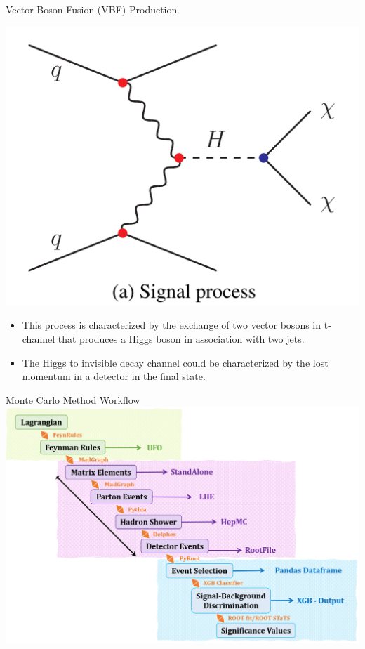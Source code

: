 \documentclass{../../bredelebeamer}
\begin{document}
\begin{frame}{Vector Boson Fusion (VBF) Production}
    \begin{minipage}{0.42\textwidth}
        \begin{center}
            \includegraphics[width=\textwidth]{../Images/VBF.png}
        \end{center}
    \end{minipage}
    \hfill
    \begin{minipage}{0.5\textwidth}
        \begin{itemize}
            \item This process is characterized by the exchange of two vector bosons in t-channel that produces a Higgs boson in association with two jets. 
            \vspace{0.5cm}
            \item The Higgs to invisible decay channel could be characterized by the lost momentum in a detector in the final state.
        \end{itemize}
        

    \end{minipage}
\end{frame}


\begin{frame}{Monte Carlo Method Workflow}
	\includegraphics[width=1.0\linewidth]{../Images/Workflow.png}
\end{frame}
\end{document}
